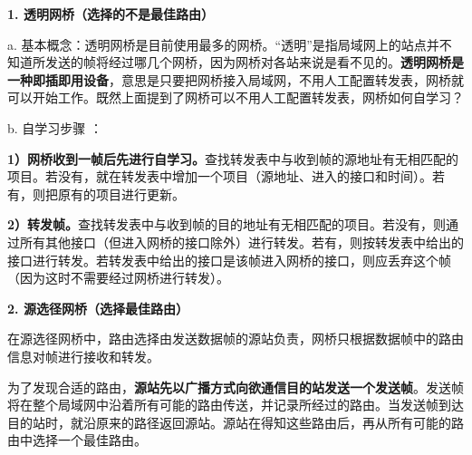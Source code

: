 \textbf{{1. 透明网桥（选择的不是最佳路由）}}

a.
基本概念：透明网桥是目前使用最多的网桥。``透明''是指局域网上的站点并不知道所发送的帧将经过哪几个网桥，因为网桥对各站来说是看不见的。\textbf{{透明网桥是一种即插即用设备}}，意思是只要把网桥接入局域网，不用人工配置转发表，网桥就可以开始工作。{既然上面提到了网桥可以不用人工配置转发表，网桥如何自学习？}

b. 自学习步骤 ：

\textbf{1）网桥收到一帧后先进行自学习。}查找转发表中与收到帧的源地址有无相匹配的项目。若没有，就在转发表中增加一个项目（源地址、进入的接口和时间）。若有，则把原有的项目进行更新。

\textbf{2）转发帧。}查找转发表中与收到帧的目的地址有无相匹配的项目。若没有，则通过所有其他接口（但进入网桥的接口除外）进行转发。若有，则按转发表中给出的接口进行转发。{若转发表中给出的接口是该帧进入网桥的接口，则应丢弃这个帧（因为这时不需要经过网桥进行转发）。}

\textbf{{2. 源选径网桥（选择最佳路由）}}

在源选径网桥中，路由选择由发送数据帧的源站负责，网桥只根据数据帧中的路由信息对帧进行接收和转发。

为了发现合适的路由，{\textbf{源站}}{\textbf{先以}}{\textbf{广播方式向欲通信目的站发送一个发送帧}}。发送帧将在整个局域网中沿着所有可能的路由传送，并记录所经过的路由。当发送帧到达目的站时，就沿原来的路径返回源站。源站在得知这些路由后，再从所有可能的路由中选择一个最佳路由。
